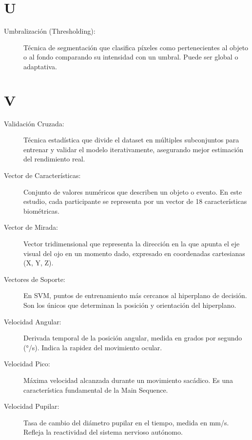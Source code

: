\section*{U}

\begin{description}
    \item[Umbralización (Thresholding):] Técnica de segmentación que clasifica píxeles como pertenecientes al objeto o al fondo comparando su intensidad con un umbral. Puede ser global o adaptativa.
\end{description}

\section*{V}

\begin{description}
    \item[Validación Cruzada:] Técnica estadística que divide el dataset en múltiples subconjuntos para entrenar y validar el modelo iterativamente, asegurando mejor estimación del rendimiento real.
    
    \item[Vector de Características:] Conjunto de valores numéricos que describen un objeto o evento. En este estudio, cada participante se representa por un vector de 18 características biométricas.
    
    \item[Vector de Mirada:] Vector tridimensional que representa la dirección en la que apunta el eje visual del ojo en un momento dado, expresado en coordenadas cartesianas (X, Y, Z).
    
    \item[Vectores de Soporte:] En SVM, puntos de entrenamiento más cercanos al hiperplano de decisión. Son los únicos que determinan la posición y orientación del hiperplano.
    
    \item[Velocidad Angular:] Derivada temporal de la posición angular, medida en grados por segundo (°/s). Indica la rapidez del movimiento ocular.
    
    \item[Velocidad Pico:] Máxima velocidad alcanzada durante un movimiento sacádico. Es una característica fundamental de la Main Sequence.
    
    \item[Velocidad Pupilar:] Tasa de cambio del diámetro pupilar en el tiempo, medida en mm/s. Refleja la reactividad del sistema nervioso autónomo.
\end{description}

